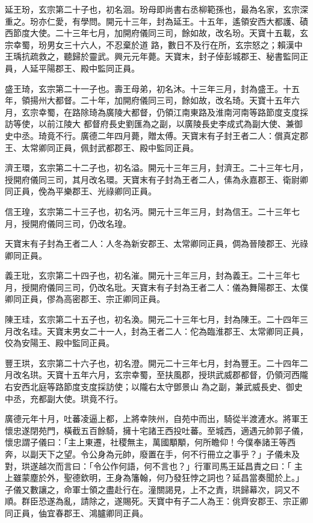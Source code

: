 \begin{pinyinscope}
 延王玢，玄宗第二十子也，初名洄。玢母即尚書右丞柳範孫也，最為名家，玄宗深重之。玢亦仁愛，有學問。開元十三年，封為延王。十五年，遙領安西大都護、磧西節度大使。二十三年七月，加開府儀同三司，餘如故，改名玢。天寶十五載，玄宗幸蜀，玢男女三十六人，不忍棄於道
 路，數日不及行在所，玄宗怒之；賴漢中王瑀抗疏救之，聽歸於靈武。興元元年薨。天寶末，封子倬彭城郡王、秘書監同正員，人延平陽郡王、殿中監同正員。



 盛王琦，玄宗第二十一子也。壽王母弟，初名沐。十三年三月，封為盛王。十五年，領揚州大都督。二十年，加開府儀同三司，餘如故，改名琦。天寶十五年六月，玄宗幸蜀，在路除琦為廣陵大都督，仍領江南東路及淮南河南等路節度支度採訪等使，以前江陵大
 都督府長史劉匯為之副，以廣陵長史李成式為副大使、兼御史中丞。琦竟不行。廣德二年四月薨，贈太傅。天寶末有子封王者二人：償真定郡王、太常卿同正員，佩封武都郡王、殿中監同正員。



 濟王環，玄宗第二十二子也，初名溢。開元十三年三月，封濟王。二十三年七月，授開府儀同三司，其月改名環。天寶末有子封為王者二人，傃為永嘉郡王、衛尉卿同正員，俛為平樂郡王、光祿卿同正員。



 信王瑝，玄宗第二十三子也，初名沔。開元十三年三月，封為信王。二十三年七月，授開府儀同三司，仍改名瑝。



 天寶末有子封為王者二人：人冬為新安郡王、太常卿同正員，倜為晉陵郡王、光祿卿同正員。



 義王玭，玄宗第二十四子也，初名漼。開元十三年三月，封為義王。二十三年七月，授開府儀同三司，仍改名玭。天寶末有子封為王者二人：儀為舞陽郡王、太僕卿同正員，僇為高密郡王、宗正卿同正員。



 陳王珪，玄宗第二十五子也，初名渙。開元二十三年七月，封為陳王。二十四年三月改名珪。天寶末男女二十一人，封為王者二人：佗為臨淮郡王、太常卿同正員，佼為安陽王、殿中監同正員。



 豐王珙，玄宗第二十六子也，初名澄。開元二十三年七月，封為豐王。二十四年二月改名珙。天寶十五年六月，玄宗幸蜀，至扶風郡，授珙武威郡都督，仍領河西隴右安西北庭等路節度支度採訪使；以隴右太守鄧景山
 為之副，兼武威長史、御史中丞，充都副大使。珙竟不行。



 廣德元年十月，吐蕃凌逼上都，上將幸陜州，自苑中而出，騎從半渡滻水。將軍王懷忠遂閉苑門，橫截五百餘騎，擁十宅諸王西投吐蕃。至城西，適遇元帥郭子儀，懷忠謂子儀曰：「主上東遷，社稷無主，萬國顒顒，何所瞻仰！今僕奉諸王等西奔，以副天下之望。令公身為元帥，廢置在手，何不行冊立之事乎？」子儀未及對，珙遂越次而言曰：「令公作何語，何不言也？」行軍司馬王延昌責之曰：「
 主上雖蒙塵於外，聖德欽明，王身為籓翰，何乃發狂悖之詞也？延昌當奏聞於上。」子儀又數讓之，命軍士領之盡赴行在。潼關謁見，上不之責，珙歸幕次，詞又不順。群臣恐遂為亂，請除之，遂賜死。天寶中有子二人為王：佻齊安郡王、宗正卿同正員，伷宜春郡王、鴻臚卿同正員。




\end{pinyinscope}
